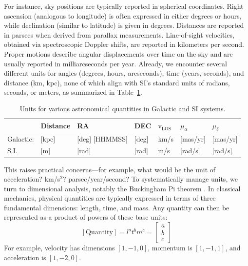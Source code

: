     For instance, sky positions are typically reported in spherical coordinates. Right ascension (analogous to longitude) is often expressed in either degrees or hours, while declination (similar to latitude) is given in degrees. Distances are reported in parsecs when derived from parallax measurements. Line-of-sight velocities, obtained via spectroscopic Doppler shifts, are reported in kilometers per second. Proper motions describe angular displacements over time on the sky and are usually reported in milliarcseconds per year. Already, we encounter several different units for angles (degrees, hours, arcseconds), time (years, seconds), and distance (km, kpc), none of which align with SI's standard units of radians, seconds, or meters, as summarized in Table~\ref{tab:units}.
    \begin{table}[]
        \caption[SI and astronomical unit comparison]{Units for various astronomical quantities in Galactic and SI systems.}
        \label{tab:units}
        \begin{tabular}{l|l|l|l|l|l|l|}
                            & Distance  & RA                     & DEC                    & \textbf{$\mathrm{v}_\mathrm{LOS}$} & $\mu_\alpha$ & $\mu_\delta$ \\ \hline
            Galactic: & {[}kpc{]} & {[}deg{]} {[}HHMMSS{]} & {[}deg{]}              & km/s                      & {[}mas/yr{]} & {[}mas/yr{]} \\ \hline
            S.I.       & {[}m{]}   & {[}rad{]}              & {[}rad{]}              & m/s                       & {[}rad/s{]}  & {[}rad/s{]}  \\ 
        \end{tabular}
    \end{table}
    This raises practical concerns—for example, what would be the unit of acceleration? km/s$^2$? parsec/year/second? To systematically manage units, we turn to dimensional analysis, notably the Buckingham Pi theorem \parencite{1914PhRv....4..345B}. In classical mechanics, physical quantities are typically expressed in terms of three fundamental dimensions: length, time, and mass. Any quantity can then be represented as a product of powers of these base units:
    \begin{equation}
        \left[\mathrm{Quantity}\right] = l^a t^b m^c =
            \begin{bmatrix}
                a\\
                b\\
                c 
            \end{bmatrix}
    \end{equation}
    For example, velocity has dimensions $[1, -1, 0]$, momentum is $[1, -1, 1]$, and acceleration is $[1, -2, 0]$.

